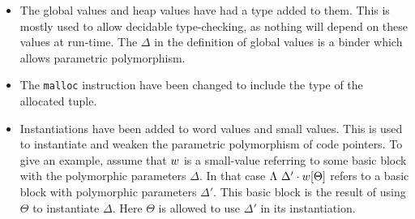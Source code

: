 \begin{itemize}
\item The global values and heap values have had a type added to them. This is
  mostly used to allow decidable type-checking, as nothing will depend on these
  values at run-time. The $\Delta$ in the definition of global values is a
  binder which allows parametric polymorphism.
\item The \texttt{malloc} instruction have been changed to include the type of
  the allocated tuple.
\item Instantiations have been added to word values and small values. This is
  used to instantiate and weaken the parametric polymorphism of code
  pointers. To give an example, assume that $w$ is a small-value referring
  to some basic block with the polymorphic parameters $\Delta$. In that case
  $\Lambda\ \Delta' \cdot w[\Theta]$ refers to a basic block with
  polymorphic parameters $\Delta'$. This basic block is the result of using
  $\Theta$ to instantiate $\Delta$. Here $\Theta$ is allowed to use $\Delta'$ in
  its instantiation.
\end{itemize}

